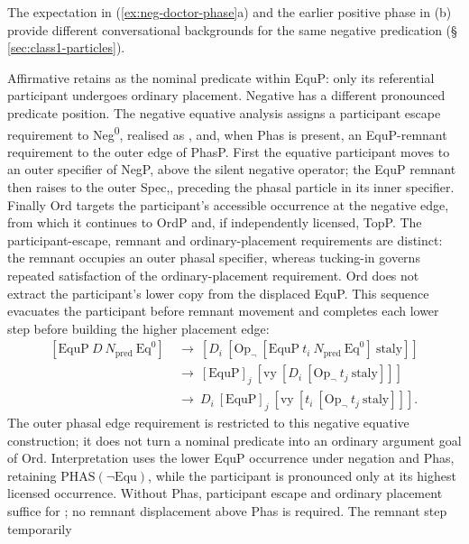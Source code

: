 The expectation in (\ref{ex:neg-doctor-phase}a) and the earlier positive
phase in (b) provide different conversational backgrounds for the same
negative predication (§\,\ref{sec:class1-particles}).

Affirmative  retains  as the nominal
 predicate within EquP: only its referential participant undergoes ordinary
 placement. Negative  has a different pronounced
 predicate position. The negative equative analysis assigns a participant
 escape requirement to Neg\textsuperscript{0}, realised as ,
 and, when Phas is present, an EquP-remnant requirement to the outer edge of
 PhasP. First the equative participant moves to an outer specifier of NegP,
 above the silent negative operator; the EquP remnant then raises to the outer
 Spec,, preceding the phasal particle in its inner specifier.
 Finally Ord targets the participant's accessible occurrence at the negative
 edge, from which it continues to OrdP and, if independently licensed, TopP.
 The participant-escape, remnant and ordinary-placement requirements are
 distinct: the remnant occupies an outer phasal specifier, whereas tucking-in
 governs repeated satisfaction of the ordinary-placement requirement.
 Ord does not extract the participant's lower copy from the displaced EquP.
 This sequence evacuates the participant before remnant movement and
 completes each lower step before building the higher placement edge:
\[
 \begin{aligned}
 [\mathrm{EquP}\ D\ N_{\mathrm{pred}}\ \mathrm{Eq}^{0}]
 &\ \longrightarrow\ [D_i\ [\mathrm{Op}_{\neg}\ [\mathrm{EquP}\ t_i\ N_{\mathrm{pred}}\ \mathrm{Eq}^{0}]\ \mathrm{staly}]]\\
 &\ \longrightarrow\ [\mathrm{EquP}]_j\ [\mathrm{vy}\ [D_i\ [\mathrm{Op}_{\neg}\ t_j\ \mathrm{staly}]]]\\
 &\ \longrightarrow\ D_i\ [\mathrm{EquP}]_j\ [\mathrm{vy}\ [t_i\ [\mathrm{Op}_{\neg}\ t_j\ \mathrm{staly}]]].
 \end{aligned}
\]
The outer phasal edge requirement is restricted to this negative equative
 construction; it does not turn a nominal predicate into an ordinary argument
 goal of Ord. Interpretation uses the lower EquP occurrence under negation
 and Phas, retaining $\mathrm{PHAS}(\neg\mathrm{Equ})$, while the participant
 is pronounced only at its highest licensed occurrence. Without Phas,
 participant escape and ordinary placement suffice for ;
 no remnant displacement above Phas is required. The remnant step temporarily
